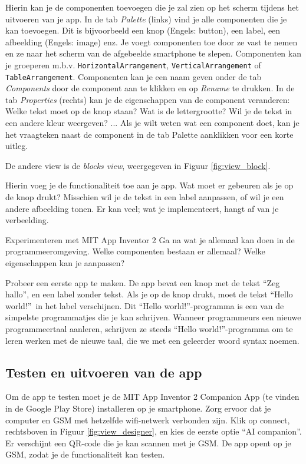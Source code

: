 Hierin kan je de componenten toevoegen die je zal zien op het scherm tijdens het uitvoeren van je app. In de tab \emph{Palette} (links) vind je alle componenten die je kan toevoegen. Dit is bijvoorbeeld een knop (Engels: button), een label, een afbeelding (Engels: image) enz. Je voegt componenten toe door ze vast te nemen en ze naar het scherm van de afgebeelde smartphone te slepen. Componenten kan je groeperen m.b.v. \texttt{HorizontalArrangement}, \texttt{VerticalArrangement} of \texttt{TableArrangement}. Componenten kan je een naam geven onder de tab \emph{Components} door de component aan te klikken en op \emph{Rename} te drukken. In de tab \emph{Properties} (rechts) kan je de eigenschappen van de component veranderen: Welke tekst moet op de knop staan? Wat is de lettergrootte? Wil je de tekst in een andere kleur weergeven? ... Als je wilt weten wat een component doet, kan je het vraagteken naast de component in de tab Palette aanklikken voor een korte uitleg.

De andere view is de \emph{blocks view}, weergegeven in Figuur \ref{fig:view_block}.


Hierin voeg je de functionaliteit toe aan je app. Wat moet er gebeuren als je op de knop drukt? Misschien wil je de tekst in een label aanpassen, of wil je een andere afbeelding tonen. Er kan veel; wat je implementeert, hangt af van je verbeelding.

\begin{opdracht}{Experimenteren met MIT App Inventor 2}
Ga na wat je allemaal kan doen in de programmeeromgeving. Welke componenten bestaan er allemaal? Welke eigenschappen kan je aanpassen?

Probeer een eerste app te maken. De app bevat een knop met de tekst \textquotedblleft Zeg hallo\textquotedblright, en een label zonder tekst. Als je op de knop drukt, moet de tekst \textquotedblleft Hello world!\textquotedblright \ in het label verschijnen. Dit \textquotedblleft Hello world!\textquotedblright-programma is een van de simpelste programmatjes die je kan schrijven. Wanneer programmeurs een nieuwe programmeertaal aanleren, schrijven ze steeds \textquotedblleft Hello world!\textquotedblright-programma om te leren werken met de nieuwe taal, die we met een geleerder woord syntax noemen.
\end{opdracht}

\subsection{Testen en uitvoeren van de app}
Om de app te testen moet je de MIT App Inventor 2 Companion App (te vinden in de Google Play Store) installeren op je smartphone. 
Zorg ervoor dat je computer en GSM met hetzelfde wifi-netwerk verbonden zijn. 
Klik op connect, rechtsboven in Figuur \ref{fig:view_designer}, en kies de eerste optie \textquotedblleft AI companion\textquotedblright. Er verschijnt een QR-code die je kan scannen met je GSM. De app opent op je GSM, zodat je de functionaliteit kan testen.

